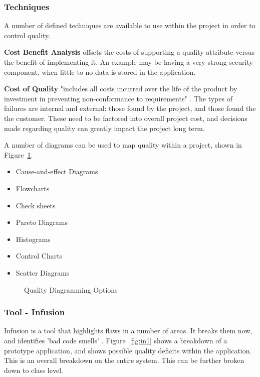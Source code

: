 \subsubsection{Techniques}

A number of defined techniques are available to use within the project in order to control quality. 

\textbf{Cost Benefit Analysis} offsets the costs of supporting a quality attribute versus the benefit of implementing it. An example may be having a very strong security component, when little to no data is stored in the application.

\textbf{Cost of Quality} "includes all costs incurred over the life of the product by investment in preventing non-conformance to requirements" \parencite{pmbok}. The types of failures are internal and external: those found by the project, and those found the the customer. These need to be factored into overall project cost, and decisions made regarding quality can greatly impact the project long term. 

A number of diagrams can be used to map quality within a project, shown in Figure~\ref{fig:diagram}.

\begin{itemize}
\item Cause-and-effect Diagrams
\item Flowcharts
\item Check sheets
\item Pareto Diagrams
\item Histograms
\item Control Charts
\item Scatter Diagrams
\end{itemize}
\begin{figure}[H]
\caption{Quality Diagramming Options}
\label{fig:diagram}
\end{figure}

\subsubsection{Tool - Infusion}

Infusion is a tool that highlights flaws in a number of areas. It breaks them now, and identifies 'bad code smells' \parencite{fowler}. Figure~\ref{fig:in1} shows a breakdown of a prototype application, and shows possible quality deficits within the application. This is an overall breakdown on the entire system. This can be further broken down to class level.


